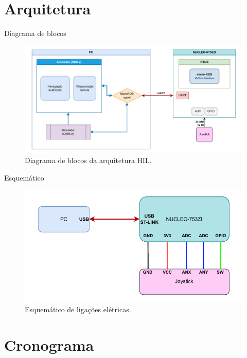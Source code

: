 \documentclass{if-beamer}
\begin{document}
\section{Arquitetura}

\begin{frame}{Diagrama de blocos}


	\begin{figure}
		\centering
		\includegraphics[width=0.95\linewidth]{img/block_diagram.pdf}
		\caption{Diagrama de blocos da arquitetura HIL.}
		\label{fig:blockdiagram}
	\end{figure}
	

\end{frame}


\begin{frame}{Esquemático}
	
		
	\begin{figure}
		\centering
		\includegraphics[width=0.8\linewidth]{img/esquematico.pdf}
		\caption{Esquemático de ligações elétricas.}
		\label{fig:esquematico}
	\end{figure}
	
\end{frame}



\section{Cronograma}
\end{document}
